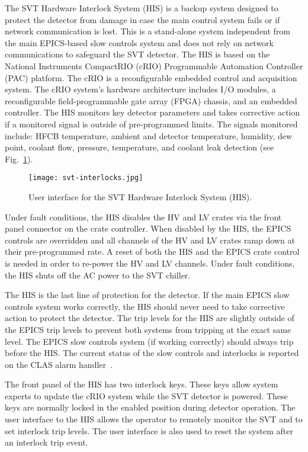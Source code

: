 The SVT Hardware Interlock System (HIS) is a backup system designed to protect the detector from damage in
case the main control system fails or if network communication is lost. This is a stand-alone system independent from
the main EPICS-based slow controls system and does not rely on network communications to safeguard the SVT
detector. The HIS is based on the National Instruments CompactRIO (cRIO) Programmable Automation Controller
(PAC) platform. The cRIO is a reconfigurable embedded control and acquisition system. The cRIO system's
hardware architecture includes I/O modules, a reconfigurable field-programmable gate array (FPGA) chassis, and
an embedded controller. The HIS monitors key detector parameters and takes corrective action if a monitored
signal is outside of pre-programmed limits. The signals monitored include: HFCB temperature, ambient and detector
temperature, humidity, dew point, coolant flow, pressure, temperature, and coolant leak detection (see
Fig.~\ref{fig:svt-interlocks}). 

\begin{figure}[hbt] 
\centering 
\texttt{[image: svt-interlocks.jpg]}
\caption{User interface for the SVT Hardware Interlock System (HIS).}
\label{fig:svt-interlocks}
\end{figure}

Under fault conditions, the HIS disables the HV and LV crates via the front panel connector on the crate controller.
When disabled by the HIS, the EPICS controls are overridden and all channels of the HV and LV crates ramp down
at their pre-programmed rate. A reset of both the HIS and the EPICS crate control is needed in order to re-power
the HV and LV channels. Under fault conditions, the HIS shuts off the AC power to the SVT chiller. 

The HIS is the last line of protection for the detector. If the main EPICS slow controls system works correctly, the
HIS should never need to take corrective action to protect the detector. The trip levels for the HIS are slightly
outside of the EPICS trip levels to prevent both systems from tripping at the exact same level. The EPICS slow
controls system (if working correctly) should always trip before the HIS. The current status of the slow controls
and interlocks is reported on the CLAS alarm handler~\cite{daq-nim}. 

The front panel of the HIS has two interlock keys. These keys allow system experts to update the cRIO system
while the SVT detector is powered. These keys are normally locked in the enabled position during detector operation.
The user interface to the HIS allows the operator to remotely monitor the SVT and to set interlock trip levels. The
user interface is also used to reset the system after an interlock trip event. 

